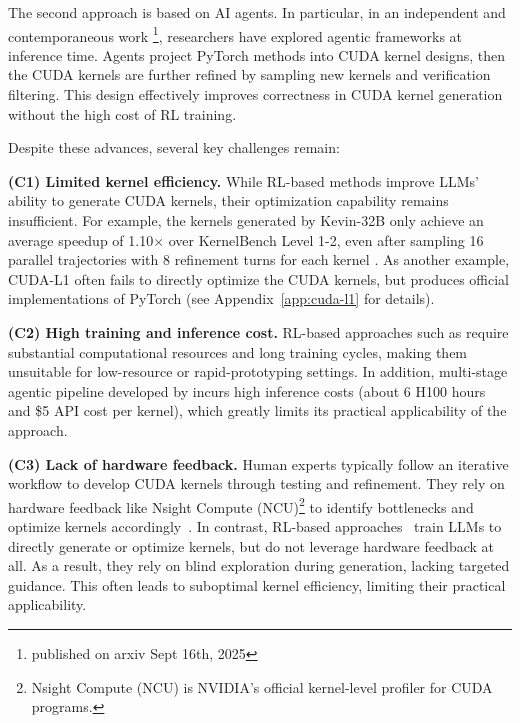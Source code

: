 The second approach is based on AI agents. In particular, in an independent and contemporaneous work \citep{lange2025robustagenticcudakernel}\footnote{published on arxiv Sept 16th, 2025}, researchers have explored agentic frameworks at inference time. 
Agents project PyTorch methods into CUDA kernel designs, then the CUDA kernels are further refined by sampling new kernels and verification filtering.
This design effectively improves correctness in CUDA kernel generation without the high cost of RL training.


Despite these advances, several key challenges remain:

\noindent \textbf{(C1) Limited kernel efficiency.}  
    While RL-based methods improve LLMs' ability to generate CUDA kernels, their optimization capability remains insufficient.  
    For example, the kernels generated by Kevin-32B only achieve an average speedup of 1.10$\times$ over KernelBench Level 1-2, even after sampling 16 parallel trajectories with 8 refinement turns for each kernel  \citep{kevin-multi-turn-rl}.  
    As another example, CUDA-L1 often fails to directly optimize the CUDA kernels, but produces official implementations of PyTorch \citep{deepreinforce2025cudal1} (see Appendix~\ref{app:cuda-l1} for details). 

    
\noindent \textbf{(C2) High training and inference cost.}  
    RL-based approaches such as \citep{deepreinforce2025cudal1,kevin-multi-turn-rl} require substantial computational resources and long training cycles, making them unsuitable for low-resource or rapid-prototyping settings.  
    In addition,  multi-stage agentic pipeline developed by \citep{lange2025robustagenticcudakernel} incurs high inference costs (about 6 H100 hours and \$5 API cost per kernel), which greatly limits its practical applicability of the approach.


\noindent \textbf{(C3) Lack of hardware feedback.}  
Human experts typically follow an iterative workflow to develop CUDA kernels through testing and refinement.  
They rely on hardware feedback like Nsight Compute (NCU)\footnote{Nsight Compute (NCU) is NVIDIA’s official kernel-level profiler for CUDA programs.} to identify bottlenecks and optimize kernels accordingly~\citep{10946796,cudaguide,w4a8gemm}.  
In contrast, RL-based approaches~\citep{deepreinforce2025cudal1,kevin-multi-turn-rl} train LLMs to directly generate or optimize kernels, but do not leverage hardware feedback at all.  
As a result, they rely on blind exploration during generation, lacking targeted guidance.  
This often leads to suboptimal kernel efficiency, limiting their practical applicability.


